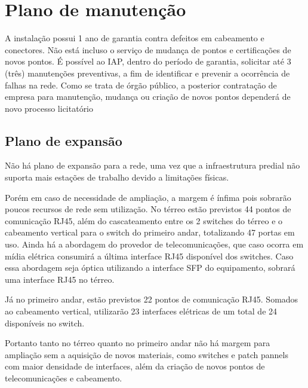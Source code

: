 \documentclass[	DIV=calc,%
							paper=a4,%
							fontsize=12pt,%
							onecolumn]{scrartcl}	 					%
\begin{document}
\section{Plano de manutenção}
A instalação possui 1 ano de garantia contra defeitos em cabeamento e conectores. Não está incluso o serviço de mudança de pontos e certificações de novos pontos. É possível ao IAP, dentro do período de garantia, solicitar até 3 (três) manutenções preventivas, a fim de identificar e prevenir a ocorrência de falhas na rede.
Como se trata de órgão público, a posterior contratação de empresa para manutenção, mudança ou criação de novos pontos dependerá de novo processo licitatório


\subsection{Plano de expansão}
Não há plano de expansão para a rede, uma vez que a infraestrutura predial não suporta mais estações de trabalho devido a limitações físicas.\par
Porém em caso de necessidade de ampliação, a margem é ínfima pois sobrarão poucos recursos de rede sem utilização. No térreo estão previstos 44 pontos de comunicação RJ45, além do cascateamento entre os 2 switches do térreo e o cabeamento vertical para o switch do primeiro andar, totalizando 47 portas em uso. Ainda há a abordagem do provedor de telecomunicações, que caso ocorra em mídia elétrica consumirá a última interface RJ45 disponível dos switches. Caso essa abordagem seja óptica utilizando a interface SFP do equipamento, sobrará uma interface RJ45 no térreo.\par
Já no primeiro andar, estão previstos 22 pontos de comunicação RJ45.  Somados ao cabeamento vertical, utilizarão 23 interfaces elétricas de um total de 24 disponíveis no switch.\par
Portanto tanto no térreo quanto no primeiro andar não há margem para ampliação sem a aquisição de novos materiais, como switches e patch pannels com maior densidade de interfaces, além da criação de novos pontos de telecomunicações e cabeamento.
\end{document}
